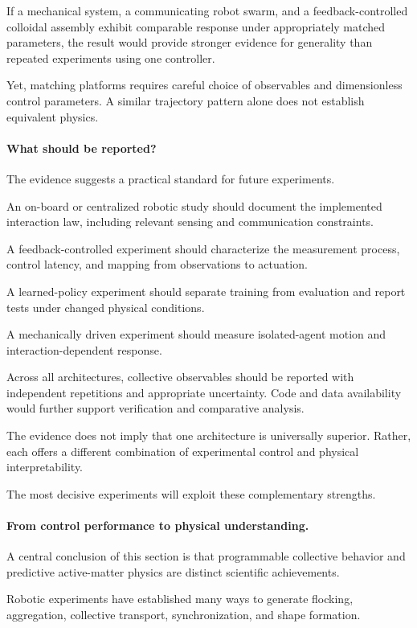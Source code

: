 If a mechanical
system, a communicating
robot swarm,
and a feedback-controlled
colloidal assembly
exhibit comparable
response under
appropriately matched
parameters, the
result would provide
stronger evidence
for generality
than repeated
experiments
using one
controller.

Yet, matching
platforms requires
careful choice
of observables
and dimensionless
control parameters.
A similar
trajectory pattern
alone does not
establish equivalent
physics.

\paragraph*{What should be reported?}

The evidence suggests a practical
standard for future experiments.

An on-board or centralized
robotic study should
document the implemented
interaction law,
including relevant
sensing and
communication constraints.

A feedback-controlled
experiment should
characterize the
measurement process,
control latency,
and mapping from
observations
to actuation.

A learned-policy
experiment should
separate training
from evaluation
and report tests
under changed
physical conditions.

A mechanically driven
experiment should
measure isolated-agent
motion and
interaction-dependent
response.

Across all architectures,
collective observables
should be reported
with independent
repetitions and
appropriate uncertainty.
Code and data
availability would
further support
verification and
comparative analysis.

The evidence does
not imply that
one architecture
is universally
superior.
Rather, each
offers a different
combination of
experimental
control and
physical interpretability.

The most decisive
experiments will
exploit these
complementary
strengths.

\paragraph*{From control performance to physical understanding.}

A central conclusion of this
section is that programmable
collective behavior and
predictive active-matter
physics are distinct
scientific achievements.

Robotic experiments
have established
many ways to
generate flocking,
aggregation,
collective transport,
synchronization,
and shape formation.

